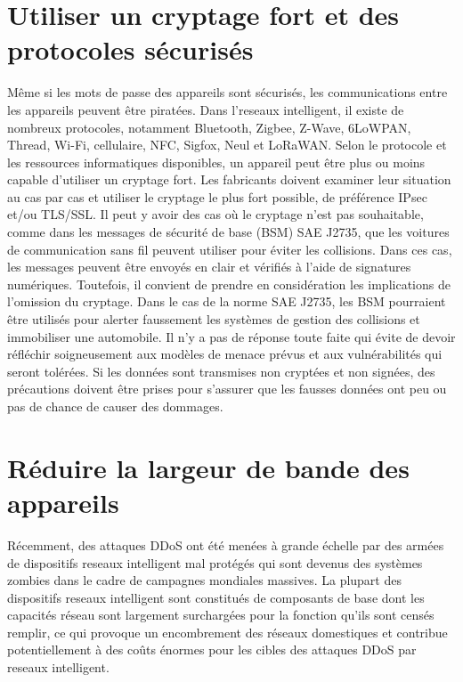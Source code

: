 \documentclass[12pt]{report}
\begin{document}
\hypertarget{utiliser-un-cryptage-fort-et-des-protocoles-suxe9curisuxe9s}{%
      \section{\texorpdfstring{Utiliser un cryptage fort et des protocoles
              sécurisés
        }{Utiliser un cryptage fort et des protocoles sécurisés }}\label{utiliser-un-cryptage-fort-et-des-protocoles-suxe9curisuxe9s}}

Même si les mots de passe des appareils sont sécurisés, les
communications entre les appareils peuvent être piratées. Dans l'reseaux intelligent, il
existe de nombreux protocoles, notamment Bluetooth, Zigbee, Z-Wave,
6LoWPAN, Thread, Wi-Fi, cellulaire, NFC, Sigfox, Neul et LoRaWAN. Selon
le protocole et les ressources informatiques disponibles, un appareil
peut être plus ou moins capable d'utiliser un cryptage fort. Les
fabricants doivent examiner leur situation au cas par cas et utiliser le
cryptage le plus fort possible, de préférence IPsec et/ou TLS/SSL. Il
peut y avoir des cas où le cryptage n'est pas souhaitable, comme dans
les messages de sécurité de base (BSM) SAE J2735, que les voitures de
communication sans fil peuvent utiliser pour éviter les collisions. Dans
ces cas, les messages peuvent être envoyés en clair et vérifiés à l'aide
de signatures numériques. Toutefois, il convient de prendre en
considération les implications de l'omission du cryptage. Dans le cas de
la norme SAE J2735, les BSM pourraient être utilisés pour alerter
faussement les systèmes de gestion des collisions et immobiliser une
automobile. Il n'y a pas de réponse toute faite qui évite de devoir
réfléchir soigneusement aux modèles de menace prévus et aux
vulnérabilités qui seront tolérées. Si les données sont transmises non
cryptées et non signées, des précautions doivent être prises pour
s'assurer que les fausses données ont peu ou pas de chance de causer des
dommages.

\hypertarget{ruxe9duire-la-largeur-de-bande-des-appareils}{%
      \section{\texorpdfstring{Réduire la largeur de bande des appareils
        }{Réduire la largeur de bande des appareils }}\label{ruxe9duire-la-largeur-de-bande-des-appareils}}

Récemment, des attaques DDoS ont été menées à grande échelle par des
armées de dispositifs reseaux intelligent mal protégés qui sont devenus des systèmes
zombies dans le cadre de campagnes mondiales massives. La plupart des
dispositifs reseaux intelligent sont constitués de composants de base dont les capacités
réseau sont largement surchargées pour la fonction qu'ils sont censés
remplir, ce qui provoque un encombrement des réseaux domestiques et
contribue potentiellement à des coûts énormes pour les cibles des
attaques DDoS par reseaux intelligent.
\end{document}
